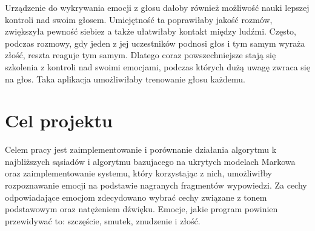 \documentclass[declaration,shortabstract]{iithesis}
\begin{document}
Urządzenie do wykrywania emocji z głosu dałoby również możliwość nauki lepszej kontroli nad swoim głosem. Umiejętność ta poprawiłaby jakość rozmów, zwiększyła pewność siebiez a także ułatwiłaby kontakt między ludźmi. Często, podczas rozmowy, gdy jeden z jej uczestników podnosi głos i tym samym wyraża złość, reszta reaguje tym samym. Dlatego coraz powszechniejsze stają się szkolenia z kontroli nad swoimi emocjami, podczas których dużą uwagę zwraca się na głos. Taka aplikacja umożliwiłaby trenowanie głosu każdemu. 

\section{Cel projektu}
Celem pracy jest zaimplementowanie i porównanie działania algorytmu k najbliższych sąsiadów i algorytmu bazujacego na ukrytych modelach Markowa oraz zaimplementowanie systemu, który korzystając z nich, umożliwiłby rozpoznawanie emocji na podstawie nagranych fragmentów wypowiedzi.
Za cechy odpowiadające emocjom zdecydowano wybrać cechy związane z tonem podstawowym oraz natężeniem dźwięku. Emocje, jakie program powinien przewidywać to: szczęście, smutek, znudzenie i złość.
\end{document}
